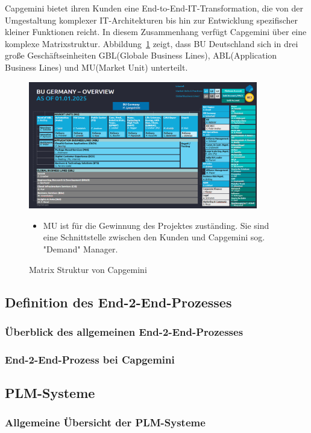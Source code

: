 \documentclass[a4paper, 12pt]{scrartcl}
\begin{document}
Capgemini bietet ihren Kunden eine End-to-End-IT-Transformation, die von der Umgestaltung komplexer IT-Architekturen bis hin zur Entwicklung spezifischer kleiner Funktionen reicht. In diesem Zusammenhang verfügt Capgemini über eine komplexe Matrixstruktur. Abbildung~\ref{fig:Matrix Struktur} zeigt, dass BU Deutschland sich in drei große Geschäftseinheiten GBL(Globale Business Lines), ABL(Application Business Lines) und MU(Market Unit) unterteilt.
	\newpage
	\begin{figure}[h]
		\begin{center}
			\includegraphics[width=10cm]{BU Germany CAP.png}
			\caption{Matrix Struktur von Capgemini}
			\label{fig:Matrix Struktur}
		\end{center}
	\begin{itemize}
		\item MU ist für die Gewinnung des Projektes zuständing. Sie sind eine Schnittstelle zwischen den Kunden und Capgemini sog. "Demand" Manager. 
	\end{itemize}
	\end{figure}
	\newpage
	\subsection{Definition des End-2-End-Prozesses}
	\subsubsection{Überblick des allgemeinen End-2-End-Prozesses} %

	\subsubsection{End-2-End-Prozess bei Capgemini}
	\subsection{PLM-Systeme}
	\subsubsection{Allgemeine Übersicht der PLM-Systeme}
\end{document}

